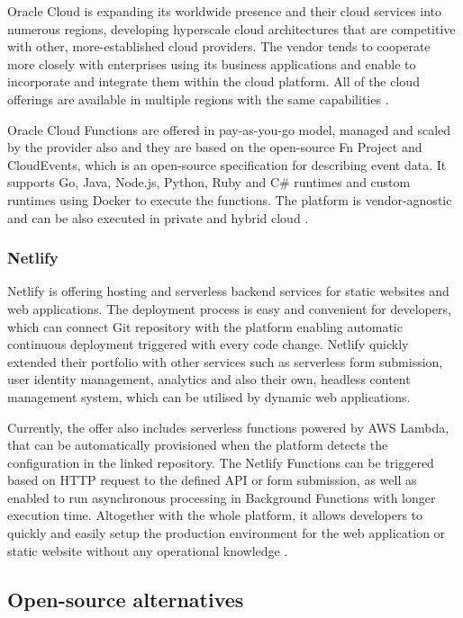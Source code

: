 Oracle Cloud is expanding its worldwide presence and their cloud services into numerous regions, developing hyperscale cloud architectures that are competitive with other, more-established cloud providers. The vendor tends to cooperate more closely with enterprises using its business applications and enable to incorporate and integrate them within the cloud platform. All of the cloud offerings are available in multiple regions with the same capabilities \cite{Gartner}.

Oracle Cloud Functions are offered in pay-as-you-go model, managed and scaled by the provider also and they are based on the open-source Fn Project and CloudEvents, which is an open-source specification for describing event data. It supports Go, Java, Node.js, Python, Ruby and C\# runtimes and custom runtimes using Docker to execute the functions. The platform is vendor-agnostic and can be also executed in private and hybrid cloud \cite{FnProject}.

\subsubsection*{Netlify}

Netlify is offering hosting and serverless backend services for static websites and web applications. The deployment process is easy and convenient for developers, which can connect Git repository with the platform enabling automatic continuous deployment triggered with every code change. Netlify quickly extended their portfolio with other services such as serverless form submission, user identity management, analytics and also their own, headless content management system, which can be utilised by dynamic web applications.

Currently, the offer also includes serverless functions powered by AWS Lambda, that can be automatically provisioned when the platform detects the configuration in the linked repository. The Netlify Functions can be triggered based on HTTP request to the defined API or form submission, as well as enabled to run asynchronous processing in Background Functions with longer execution time. Altogether with the whole platform, it allows developers to quickly and easily setup the production environment for the web application or static website without any operational knowledge \cite{NetlifyFunction}.

\subsection{Open-source alternatives}

